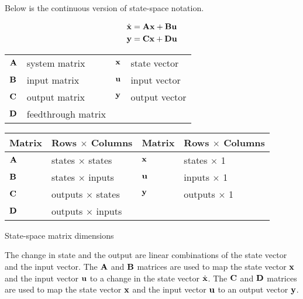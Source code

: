 Below is the continuous version of state-space notation.
\begin{definition}%
  \begin{align}
    \dot{\mathbf{x}} &= \mathbf{A}\mathbf{x} + \mathbf{B}\mathbf{u} \label{eq:ss_ctrl_x} \\
    \mathbf{y} &= \mathbf{C}\mathbf{x} + \mathbf{D}\mathbf{u} \label{eq:ss_ctrl_y}
  \end{align}
  \begin{figurekey}
    \begin{tabular}{llll}
      $\mathbf{A}$ & system matrix      & $\mathbf{x}$ & state vector \\
      $\mathbf{B}$ & input matrix       & $\mathbf{u}$ & input vector \\
      $\mathbf{C}$ & output matrix      & $\mathbf{y}$ & output vector \\
      $\mathbf{D}$ & feedthrough matrix &  &  \\
    \end{tabular}
  \end{figurekey}
\end{definition}
\begin{booktable}
  \begin{tabular}{|ll|ll|}
    \hline
    \rowcolor{headingbg}
    \textbf{Matrix} & \textbf{Rows $\times$ Columns} &
    \textbf{Matrix} & \textbf{Rows $\times$ Columns} \\
    \hline
    $\mathbf{A}$ & states $\times$ states & $\mathbf{x}$ & states $\times$ 1 \\
    $\mathbf{B}$ & states $\times$ inputs & $\mathbf{u}$ & inputs $\times$ 1 \\
    $\mathbf{C}$ & outputs $\times$ states & $\mathbf{y}$ & outputs $\times$ 1 \\
    $\mathbf{D}$ & outputs $\times$ inputs &  &  \\
    \hline
  \end{tabular}
  \caption{State-space matrix dimensions}
\end{booktable}

The change in \gls{state} and the \gls{output} are linear combinations of the
\gls{state} vector and the \gls{input} vector. The $\mathbf{A}$ and $\mathbf{B}$
matrices are used to map the \gls{state} vector $\mathbf{x}$ and the \gls{input}
vector $\mathbf{u}$ to a change in the \gls{state} vector $\dot{\mathbf{x}}$. The
$\mathbf{C}$ and $\mathbf{D}$ matrices are used to map the \gls{state} vector
$\mathbf{x}$ and the \gls{input} vector $\mathbf{u}$ to an \gls{output} vector
$\mathbf{y}$.
